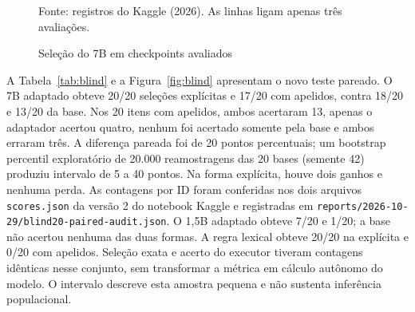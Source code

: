 \documentclass[12pt,a4paper]{article}
\begin{document}
\begin{figure}[htbp]\centering\caption{Seleção do 7B em checkpoints avaliados}\label{fig:development}\par{\fontsize{10}{12}\selectfont Fonte: registros do Kaggle (2026). As linhas ligam apenas três avaliações.\par}\end{figure}

A Tabela~\ref{tab:blind} e a Figura~\ref{fig:blind} apresentam o novo teste pareado. O 7B adaptado obteve 20/20 seleções explícitas e 17/20 com apelidos, contra 18/20 e 13/20 da base. Nos 20 itens com apelidos, ambos acertaram 13, apenas o adaptador acertou quatro, nenhum foi acertado somente pela base e ambos erraram três. A diferença pareada foi de 20 pontos percentuais; um bootstrap percentil exploratório de 20.000 reamostragens das 20 bases (semente 42) produziu intervalo de 5 a 40 pontos. Na forma explícita, houve dois ganhos e nenhuma perda. As contagens por ID foram conferidas nos dois arquivos \texttt{scores.json} da versão 2 do notebook Kaggle e registradas em \texttt{reports/2026-10-29/blind20-paired-audit.json}. O 1,5B adaptado obteve 7/20 e 1/20; a base não acertou nenhuma das duas formas. A regra lexical obteve 20/20 na explícita e 0/20 com apelidos. Seleção exata e acerto do executor tiveram contagens idênticas nesse conjunto, sem transformar a métrica em cálculo autônomo do modelo. O intervalo descreve esta amostra pequena e não sustenta inferência populacional.
\end{document}
